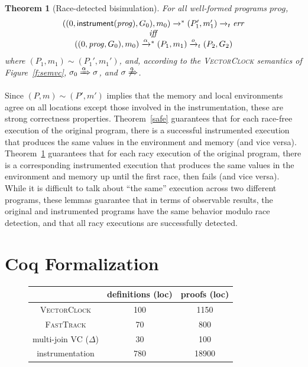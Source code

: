 \documentclass[preprint, 10pt]{sigplanconf}
\newcommand{\VCalg}{\textsc{VectorClock}\xspace}
\newcommand{\FT}{\textsc{FastTrack}\xspace}
\newcommand{\instrp}[1]{\ensuremath{\mathsf{instrument}(#1)}}
\newcommand{\cfg}[2]{\ensuremath{(#1, #2)}}
\newcommand{\execstar}[4]{\ensuremath{\cfg{#1}{#2} \tto{#3} #4}}
\newcommand{\execs}[3]{\ensuremath{ \xrightarrow{#2}_{#1} #3}}
\newcommand{\tto}[1]{\mathrel{
  \vphantom{\xrightarrow{#1}}
  \smash{\xrightarrow{#1}}
  \vphantom{\to}^{*}}
}
\newtheorem{theorem}{Theorem}
\begin{document}
\begin{theorem}[Race-detected bisimulation]\label{race}For all well-formed programs $\mathit{prog}$, 
\[
\begin{array}{c}
\execstar{(0, \instrp{\mathit{prog}}, G_0)}{m_0}{}{(P_1', m_1')} \execs{t}{}{\mathit{err}}\\ 
\mathit{iff} \\ 
\execstar{(0, \mathit{prog}, G_0)}{m_0}{\alpha}{(P_1, m_1)} \execs{t}{o}{(P_2, G_2)}
\end{array}
\]
%
where $(P_1, m_1) \sim (P_1', m_1')$, and, according to the \VCalg semantics of Figure~\ref{f:semvc}, $\sigma_0 \xRightarrow{\alpha} \sigma$, and $\sigma \not\xRightarrow{o}$.

\end{theorem}
Since $(P, m) \sim (P', m')$ implies that the memory and local environments agree on all locations except those involved in the instrumentation, these are strong correctness properties. Theorem~\ref{safe} guarantees that for each race-free execution of the original program, there is a successful instrumented execution that produces the same values in the environment and memory (and vice versa). Theorem~\ref{race} guarantees that for each racy execution of the original program, there is a corresponding instrumented execution that produces the same values in the environment and memory up until the first race, then fails (and vice versa). While it is difficult to talk about ``the same'' execution across two different programs, these lemmas guarantee that in terms of observable results, the original and instrumented programs have the same behavior modulo race detection, and that all racy executions are successfully detected.

\section{Coq Formalization}
\begin{figure}[h]
\begin{tabular}{c || c | c}
& definitions (loc) & proofs (loc)\\
\hline
\VCalg & 100 & 1150\\
\FT & 70 & 800\\
multi-join \textsc{VC} ($\Delta$)& 30 & 100\\
instrumentation & 780 & 18900
\end{tabular}
\end{figure}
\end{document}
